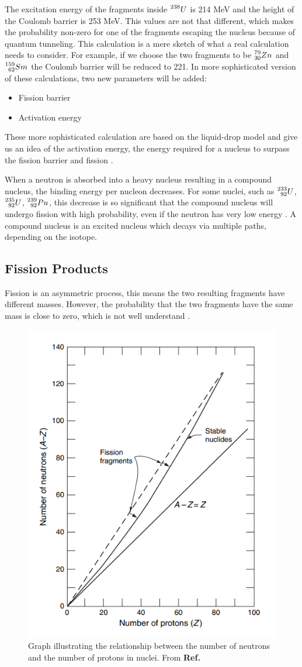 The excitation energy of the fragments inside $\prescript{238}{}{U}$ is 214 MeV and the height of the Coulomb barrier is 253 MeV. This values are not that different, which  makes the probability non-zero for one of the fragments escaping the nucleus because of quantum tunneling. This calculation is a mere sketch  of what a real calculation needs to consider. For example, if we choose the two fragments to be $\prescript{79}{30}{Zn}$ and $\prescript{159}{62}{Sm}$ the Coulomb barrier will be reduced to 221. In more sophisticated version of these calculations, two new parameters will be added:

\begin{itemize}
    \item Fission barrier 
    \item Activation energy
\end{itemize}

These more sophisticated calculation are based on the liquid-drop model and give us an idea of the activation energy, the energy required for a nucleus to surpass the fission barrier and fission \cite{Krane}.

When a neutron is absorbed into a heavy nucleus resulting in a compound nucleus, the binding energy per nucleon decreases. For some nuclei, such as $\prescript{233}{92}{U}$, $\prescript{235}{92}{U}$, $\prescript{239}{92}{Pu}$, this decrease is so significant that the compound nucleus will undergo fission with high probability, even if the neutron has very low energy \cite{Stacey_2010}. A compound nucleus is an excited nucleus which decays via multiple paths, depending on the isotope.

\subsection{Fission Products}
Fission is an asymmetric process, this means the two resulting fragments have different masses. However, the probability that the two fragments have the same mass is close to zero, which is not well understand \cite{Notas_sanabricas}. 

\begin{figure}[h]
    \centering
    \includegraphics[width=0.5\linewidth]{Kap2/Figures/stability_curve.png}
    \caption{Graph illustrating the relationship between the number of neutrons and the number of protons in nuclei. From \textbf{Ref.} \cite{Lewis_2014}}
    \label{fig:Stability_curve}
\end{figure}


